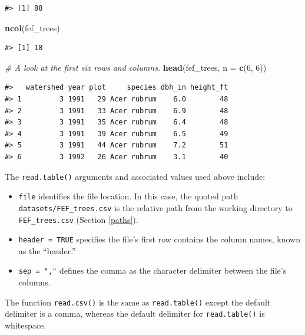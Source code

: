 \documentclass[
  11pt,
]{krantz}
\newenvironment{Shaded}{\begin{snugshade}}{\end{snugshade}}
\newcommand{\CommentTok}[1]{\textcolor[rgb]{0.56,0.35,0.01}{\textit{#1}}}
\newcommand{\DataTypeTok}[1]{\textcolor[rgb]{0.13,0.29,0.53}{#1}}
\newcommand{\DecValTok}[1]{\textcolor[rgb]{0.00,0.00,0.81}{#1}}
\newcommand{\KeywordTok}[1]{\textcolor[rgb]{0.13,0.29,0.53}{\textbf{#1}}}
\newcommand{\NormalTok}[1]{#1}
\providecommand{\tightlist}{%
  \setlength{\itemsep}{0pt}\setlength{\parskip}{0pt}}
\theoremstyle{definition}
\theoremstyle{definition}
\theoremstyle{definition}
\theoremstyle{definition}
\theoremstyle{remark}
\begin{document}
\begin{verbatim}
#> [1] 88
\end{verbatim}

\begin{Shaded}
\begin{Highlighting}[]
\KeywordTok{ncol}\NormalTok{(fef\_trees)}
\end{Highlighting}
\end{Shaded}

\begin{verbatim}
#> [1] 18
\end{verbatim}

\begin{Shaded}
\begin{Highlighting}[]
\CommentTok{\# A look at the first six rows and columns.}
\KeywordTok{head}\NormalTok{(fef\_trees, }\DataTypeTok{n =} \KeywordTok{c}\NormalTok{(}\DecValTok{6}\NormalTok{, }\DecValTok{6}\NormalTok{)) }
\end{Highlighting}
\end{Shaded}

\begin{verbatim}
#>   watershed year plot     species dbh_in height_ft
#> 1         3 1991   29 Acer rubrum    6.0        48
#> 2         3 1991   33 Acer rubrum    6.9        48
#> 3         3 1991   35 Acer rubrum    6.4        48
#> 4         3 1991   39 Acer rubrum    6.5        49
#> 5         3 1991   44 Acer rubrum    7.2        51
#> 6         3 1992   26 Acer rubrum    3.1        40
\end{verbatim}

The \texttt{read.table()} arguments and associated values used above include:

\begin{itemize}
\tightlist
\item
  \texttt{file} identifies the file location. In this case, the quoted path \texttt{datasets/FEF\_trees.csv} is the relative path from the working directory to \texttt{FEF\_trees.csv} (Section \ref{paths}).
\item
  \texttt{header\ =\ TRUE} specifies the file's first row contains the column names, known as the ``header.''
\item
  \texttt{sep\ =\ ","} defines the comma as the character delimiter between the file's columns.
\end{itemize}

The function \texttt{read.csv()} is the same as \texttt{read.table()} except the default delimiter is a comma, whereas the default delimiter for \texttt{read.table()} is whitespace.
\end{document}

